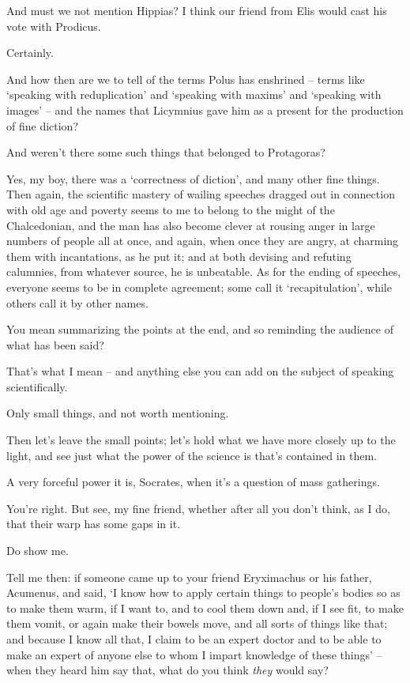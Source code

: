And must we not mention Hippias? I think our friend from Elis
would cast his vote with Prodicus.

Certainly.

 And how then are we to tell of the terms Polus
 has enshrined -- terms like ‘speaking with reduplication' and
‘speaking with maxims' and ‘speaking with images' -- and the names that
Licymnius gave him as a present for the production of fine diction?

 And weren't there some such things that belonged to
Protagoras?

Yes, my boy, there was a ‘correctness of diction', and many
other fine things. Then again, the scientific mastery of wailing
speeches dragged out in connection with old age and poverty seems to me
to belong to the might of the
Chalcedonian, and the
man has also become clever at rousing anger in  large numbers of
people all at once, and again, when once they are angry, at charming
them with incantations, as he put it; and at both devising and refuting
calumnies, from whatever source, he is unbeatable. As for the ending of
speeches, everyone seems to be in complete agreement; some call it
‘recapitulation', while others call it by other names.

You mean summarizing the points at the end, and  so
reminding the audience of what has been said?

That's what I mean -- and anything else you can add on the
subject of speaking scientifically.

Only small things, and not worth mentioning.

Then let's leave the small points; let's hold what we
 have more closely up to the light, and see just what the
power of the science is that's contained in them.

A very forceful power it is, Socrates, when it's a question of
mass gatherings.

You're right. But see, my fine friend, whether after 
all you don't think, as I do, that their warp has some gaps in it.

Do show me.

Tell me then: if someone came up to your friend Eryximachus or
his father, Acumenus,
and said, ‘I know how  to apply certain things to people's
bodies so as to make them warm, if I want to, and to cool them down and,
if I see fit, to  make them vomit, or again make their bowels
move, and all sorts of things like that; and because I know all that, I
claim to be an expert doctor and to be able to make an expert of anyone
else to whom I impart knowledge of these things' -- when they heard him
say that, what do you think {\em they} would say? 

